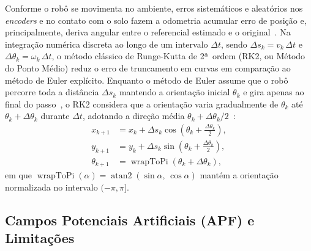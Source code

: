 Conforme o robô se movimenta no ambiente, erros sistemáticos e aleatórios
nos \textit{encoders} e no contato com o solo fazem a odometria acumular 
erro de posição e, principalmente, deriva angular entre o referencial 
estimado e o original~\cite{siegwart2004,corke2023}. Na integração 
numérica discreta ao longo de um intervalo $\Delta t$, sendo $\Delta s_k 
= v_k\,\Delta t$ e $\Delta\theta_k = \omega_k\,\Delta t$, o método
clássico de Runge-Kutta de 2ª~ordem (RK2, ou Método do Ponto Médio) reduz
o erro de truncamento em curvas em comparação ao método de Euler        
explícito. Enquanto o método de Euler assume que o robô percorre toda a
distância $\Delta s_k$ mantendo a orientação inicial $\theta_k$ e gira
apenas ao final do passo~\cite{corke2023}, o RK2 considera que a       
orientação varia gradualmente de $\theta_k$ até $\theta_k +     
\Delta\theta_k$ durante $\Delta t$, adotando a direção média $\theta_k +
\Delta\theta_k/2$~\cite{siegwart2004}:
\begin{align}
x_{k+1} &= x_k + \Delta s_k \cos\!\left(\theta_k +
\frac{\Delta\theta_k}{2}\right), \label{eq:rk2_x} \\
y_{k+1} &= y_k + \Delta s_k \sin\!\left(\theta_k +
\frac{\Delta\theta_k}{2}\right), \label{eq:rk2_y} \\
\theta_{k+1} &= \operatorname{wrapToPi}(\theta_k + \Delta\theta_k),     
\label{eq:rk2_theta}
\end{align}
em que $\operatorname{wrapToPi}(\alpha) =
\operatorname{atan2}(\sin\alpha,\, \cos\alpha)$ mantém a orientação 
normalizada no intervalo $(-\pi, \pi]$.

\subsection{Campos Potenciais Artificiais (APF) e Limitações}

